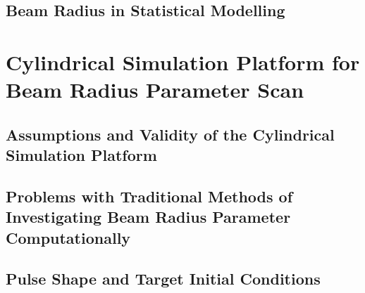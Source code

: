 \subsection{Beam Radius in Statistical Modelling}%
\label{sec:Res1_OMEGA_stat_modelling_RbRt}


\section{Cylindrical Simulation Platform for Beam Radius Parameter Scan}%
\label{sec:Res1_CylRbRt_platform}


\subsection{Assumptions and Validity of the Cylindrical Simulation Platform}%
\label{sec:Res1_platformvalidity}


\subsection{Problems with Traditional Methods of Investigating Beam Radius Parameter Computationally}%
\label{sec:Res1_computational_difficulties}


\subsection{Pulse Shape and Target Initial Conditions}%
\label{sec:Res1_initialconditions}


